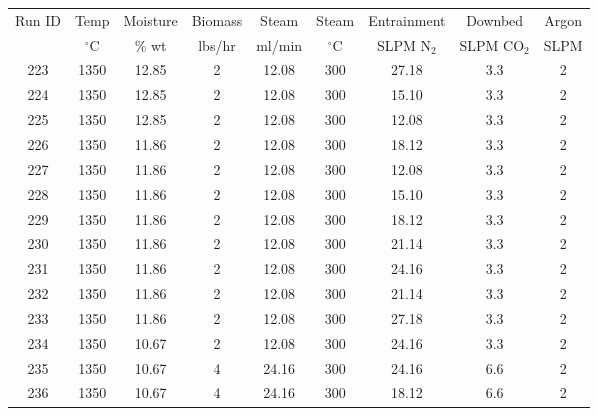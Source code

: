 \documentclass[11pt,twocolumn]{article}
\begin{document}
\begin{minipage}{\textwidth}
\begin{tabular}{ccccccccc}
\toprule
Run ID &  Temp 		&  Moisture 	&  Biomass 	&  Steam 	&  Steam 		&  Entrainment & Downbed	 & Argon \\
{}       & $^\circ$C	& \% wt		& lbs/hr		& ml/min	& $^\circ$C	& SLPM N$_2$	& SLPM CO$_2$	 & SLPM \\
\midrule
223    &       1350 &     12.85 &             2 &     12.08 &       300 &       27.18 &                3.3 &           2 \\
224    &       1350 &     12.85 &             2 &     12.08 &       300 &       15.10 &                3.3 &           2 \\
225    &       1350 &     12.85 &             2 &     12.08 &       300 &       12.08 &                3.3 &           2 \\
226    &       1350 &     11.86 &             2 &     12.08 &       300 &       18.12 &                3.3 &           2 \\
227    &       1350 &     11.86 &             2 &     12.08 &       300 &       12.08 &                3.3 &           2 \\
228    &       1350 &     11.86 &             2 &     12.08 &       300 &       15.10 &                3.3 &           2 \\
229    &       1350 &     11.86 &             2 &     12.08 &       300 &       18.12 &                3.3 &           2 \\
230    &       1350 &     11.86 &             2 &     12.08 &       300 &       21.14 &                3.3 &           2 \\
231    &       1350 &     11.86 &             2 &     12.08 &       300 &       24.16 &                3.3 &           2 \\
232    &       1350 &     11.86 &             2 &     12.08 &       300 &       21.14 &                3.3 &           2 \\
233    &       1350 &     11.86 &             2 &     12.08 &       300 &       27.18 &                3.3 &           2 \\
234    &       1350 &     10.67 &             2 &     12.08 &       300 &       24.16 &                3.3 &           2 \\
235    &       1350 &     10.67 &             4 &     24.16 &       300 &       24.16 &                6.6 &           2 \\
236    &       1350 &     10.67 &             4 &     24.16 &       300 &       18.12 &                6.6 &           2 \\

\end{tabular}
\end{minipage}
\end{document}
